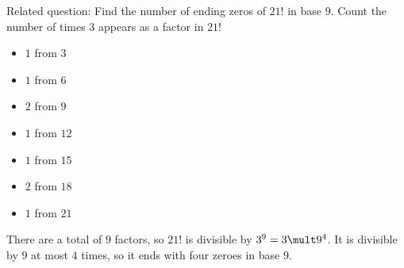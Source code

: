 \begin{boxinbox}{Related question:}
Find the number of ending zeros of $21!$ in base $9$. 
Count the number of times $3$ appears as a factor in $21!$
\begin{itemize}[label={}]
\item $1$ from $3$
\item $1$ from $6$
\item $2$ from $9$
\item $1$ from $12$
\item $1$ from $15$
\item $2$ from $18$
\item $1$ from $21$
\end{itemize}
There are a total of $9$ factors, so $21!$ is divisible by $3^9=3 \mult 9^4$. It is divisible by $9$ at most $4$ times, so it ends with four zeroes in base $9$.
\end{boxinbox}
